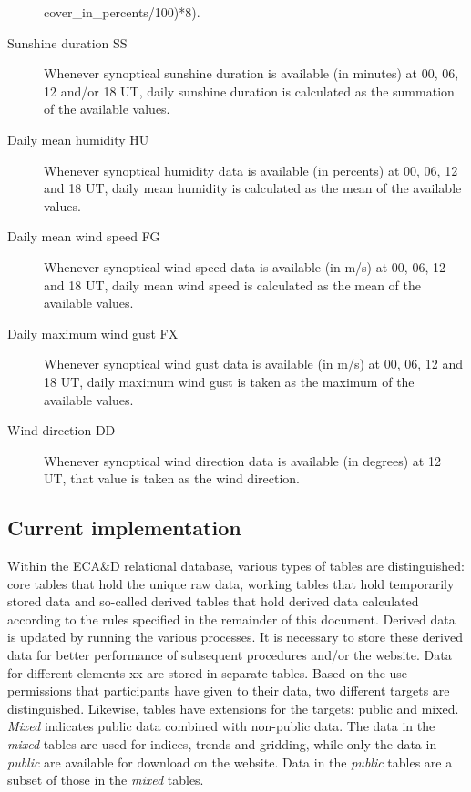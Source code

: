 \documentclass[a4paper,11pt]{article}
\begin{document}
\begin{description}
cover\_in\_percents/100)*8).
\item[Sunshine duration SS] Whenever synoptical sunshine duration is
available (in minutes) at 00, 06, 12 and/or 18 UT, daily sunshine
duration is calculated as the summation of the available values.
\item[Daily mean humidity HU] Whenever synoptical humidity data is
available (in percents) at 00, 06, 12 and 18 UT, daily mean humidity is
calculated as the mean of the available values.
\item[Daily mean wind speed FG] Whenever synoptical wind speed data is
available (in m/s) at 00, 06, 12 and 18 UT, daily mean wind speed is
calculated as the mean of the available values.
\item[Daily maximum wind gust FX] Whenever synoptical wind gust data
is available (in m/s) at 00, 06, 12 and 18 UT, daily maximum wind gust
is taken as the maximum of the available values.
\item[Wind direction DD] Whenever synoptical wind direction data is
available (in degrees) at 12 UT, that value is taken as the wind
direction.
\end{description}

\subsection{Current implementation}
\label{sec:currentimpl}

Within the ECA\&D relational database, various types of tables are
distinguished: core tables that hold the unique raw data, working
tables that hold temporarily stored data and so-called derived tables
that hold derived data calculated according to the rules specified in
the remainder of this document. Derived data is updated by running the
various processes. It is necessary to store these derived data for
better performance of subsequent procedures and/or the website. Data
for different elements xx are stored in separate tables. Based on the
use permissions that participants have given to their data, two
different targets are distinguished. Likewise, tables have extensions
for the targets: public and mixed. \emph{Mixed} indicates public data
combined with non-public data. The data in the \emph{mixed} tables are used
for indices, trends and gridding, while only the data in \emph{public} are
available for download on the website. Data in the \emph{public} tables are a
subset of those in the \emph{mixed} tables.
\end{document}
